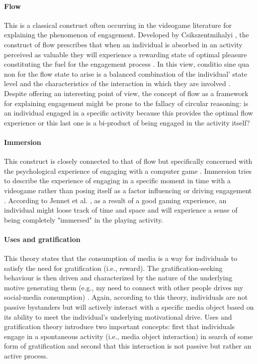 \paragraph*{Flow} This is a classical construct often occurring in the videogame literature for explaining the phenomenon of engagement. Developed by Csikszentmihalyi \cite{csikszentmihalyi2014toward}, the construct of flow prescribes that when an individual is absorbed in an activity perceived as valuable they will experience a rewarding state of optimal pleasure constituting the fuel for the engagement process \cite{boyle2012engagement}. In this view, conditio sine qua non for the flow state to arise is a balanced combination of the individual’ state level and the characteristics of the interaction in which they are involved \cite{boyle2012engagement,csikszentmihalyi2014toward}. Despite offering an interesting point of view, the concept of flow as a framework for explaining engagement might be prone to the fallacy of circular reasoning: is an individual engaged in a specific activity because this provides the optimal flow experience or this last one is a bi-product of being engaged in the activity itself? 

\paragraph*{Immersion} This construct is closely connected to that of flow but specifically concerned with the psychological experience of engaging with a computer game \cite{jennett2008measuring}. Immersion tries to describe the experience of engaging in a specific moment in time with a videogame  rather than posing itself as a factor influencing or driving engagement \cite{jennett2008measuring}. According to Jennet et al. \cite{jennett2008measuring}, as a result of a good gaming experience, an individual might loose track of time and space and will experience a sense of being completely "immersed" in the playing activity.

\paragraph*{Uses and gratification} This theory states that the consumption of media is a way for individuals to satisfy the need for gratification (i.e., reward). The gratification-seeking behaviour is then driven and characterized by the nature of the underlying motive generating them (e.g., my need to connect with other people drives my social-media consumption) \cite{lucas2004sex}. Again, according to this theory, individuals are not passive bystanders but will actively interact with a specific media object based on its ability to meet the individual's underlying motivational drive. Uses and gratification theory introduce two important concepts: first that individuals engage in a spontaneous activity (i.e., media object interaction) in search of some form of gratification and second that this interaction is not passive but rather an active process.

